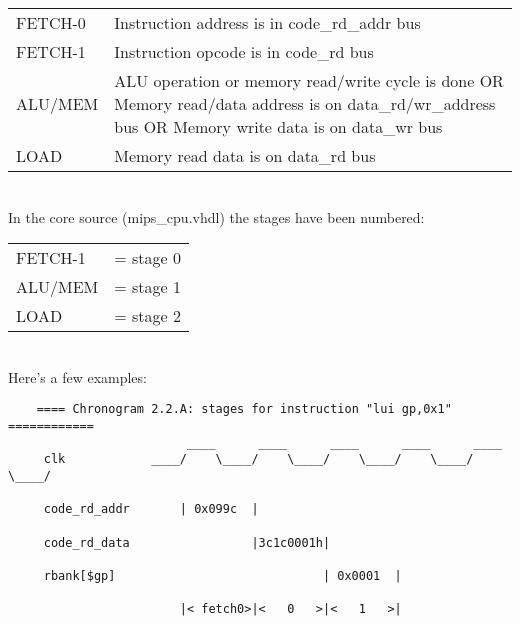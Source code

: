 \documentclass[11pt]{article}
\begin{document}
    \begin{tabular}{ l l }
        FETCH-0   & Instruction address is in code\_rd\_addr bus\\
        FETCH-1   & Instruction opcode is in code\_rd bus\\
        ALU/MEM   & ALU operation or memory read/write cycle is done OR
                      Memory read/data address is on data\_rd/wr\_address bus OR
                      Memory write data is on data\_wr bus\\
        LOAD      & Memory read data is on data\_rd bus
    \end{tabular}\\        
    
    In the core source (mips\_cpu.vhdl) the stages have been numbered:\\
    
    \begin{tabular}{ l l }
        FETCH-1 & = stage 0\\
        ALU/MEM & = stage 1\\
        LOAD    & = stage 2
    \end{tabular}\\  
    
    Here's a few examples:\\

\begin{verbatim}
    ==== Chronogram 2.2.A: stages for instruction "lui gp,0x1" ============
                         ____      ____      ____      ____      ____
     clk            ____/    \____/    \____/    \____/    \____/    \____/

     code_rd_addr       | 0x099c  |                                        
     
     code_rd_data                 |3c1c0001h|

     rbank[$gp]                             | 0x0001  |
     
                        |< fetch0>|<   0   >|<   1   >|
\end{verbatim}\\
\end{document}
